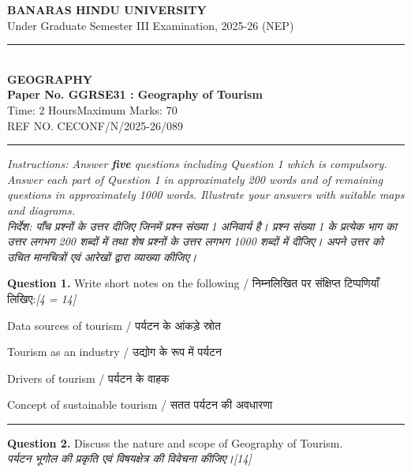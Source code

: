 \documentclass[11pt,a4paper]{article}
\newcommand{\pts}[1]{\hfill   \textit{[#1]}}
\begin{document}
\begin{center}
  {\large\bfseries BANARAS HINDU UNIVERSITY}\\[2pt]
  {\normalsize Under Graduate Semester III Examination, 2025-26 (NEP)}\\[6pt]
  \rule{0.8\linewidth}{0.5pt}\\[6pt]
  {\large\bfseries GEOGRAPHY}\\[4pt]
  {\large\bfseries Paper No. GGRSE31 : Geography of Tourism}\\[4pt]
  {\normalsize Time: 2 Hours\hfill Maximum Marks: 70}\\[2pt]
  {\small REF NO. CECONF/N/2025-26/089}
\end{center}

\rule{\linewidth}{0.4pt}

\smallskip



\noindent   \textit{Instructions: Answer   \textbf{five} questions including Question 1 which is compulsory. Answer each part of Question 1 in approximately 200 words and of remaining questions in approximately 1000 words. Illustrate your answers with suitable maps and diagrams.}\\[4pt]



\noindent   \textit{निर्देश: पाँच प्रश्नों के उत्तर दीजिए जिनमें प्रश्न संख्या 1 अनिवार्य है। प्रश्न संख्या 1 के प्रत्येक भाग का उत्तर लगभग 200 शब्दों में तथा शेष प्रश्नों के उत्तर लगभग 1000 शब्दों में दीजिए। अपने उत्तर को उचित मानचित्रों एवं आरेखों द्वारा व्याख्या कीजिए।}

\bigskip




\noindent   \textbf{Question 1.} Write short notes on the following / निम्नलिखित पर संक्षिप्त टिप्पणियाँ लिखिए:\pts{4   = 14}

\begin{parts}
  \item Data sources of tourism / पर्यटन के आंकड़े स्रोत
  \item Tourism as an industry / उद्योग के रूप में पर्यटन
  \item Drivers of tourism / पर्यटन के वाहक
  \item Concept of sustainable tourism / सतत पर्यटन की अवधारणा
\end{parts}

\medskip\rule{\linewidth}{0.2pt}\medskip




\noindent   \textbf{Question 2.} Discuss the nature and scope of Geography of Tourism.\\
   \textit{पर्यटन भूगोल की प्रकृति एवं विषयक्षेत्र की विवेचना कीजिए।}\pts{14}
\end{document}
